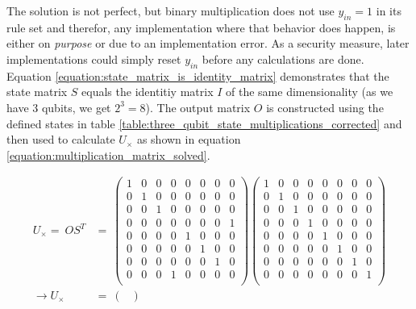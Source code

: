 \newpage

The solution is not perfect, but binary multiplication does not use $y_{in} = 1$ in its rule set and therefor, any implementation where that behavior does happen, is either on \emph{purpose} or due to an implementation error. As a security measure, later implementations could simply reset $y_{in}$ before any calculations are done. Equation \ref{equation:state_matrix_is_identity_matrix} demonstrates that the state matrix $S$ equals the identitiy matrix $I$ of the same dimensionality (as we have 3 qubits, we get $2^3 = 8$). The output matrix $O$ is constructed using the defined states in table \ref{table:three_qubit_state_multiplications_corrected} and then used to calculate $U_{\times}$ as shown in equation \ref{equation:multiplication_matrix_solved}.

\begin{equation}
    \begin{split}
        U_{\times} =\ OS^T &=\ \begin{pmatrix}
         1 & 0 & 0 & 0 & 0 & 0 & 0 & 0\\
         0 & 1 & 0 & 0 & 0 & 0 & 0 & 0\\
         0 & 0 & 1 & 0 & 0 & 0 & 0 & 0\\
         0 & 0 & 0 & 0 & 0 & 0 & 0 & 1\\
         0 & 0 & 0 & 0 & 1 & 0 & 0 & 0\\
         0 & 0 & 0 & 0 & 0 & 1 & 0 & 0\\
         0 & 0 & 0 & 0 & 0 & 0 & 1 & 0\\
         0 & 0 & 0 & 1 & 0 & 0 & 0 & 0\\
         \end{pmatrix}\begin{pmatrix}
         1 & 0 & 0 & 0 & 0 & 0 & 0 & 0\\
         0 & 1 & 0 & 0 & 0 & 0 & 0 & 0\\ 
         0 & 0 & 1 & 0 & 0 & 0 & 0 & 0\\
         0 & 0 & 0 & 1 & 0 & 0 & 0 & 0\\
         0 & 0 & 0 & 0 & 1 & 0 & 0 & 0\\
         0 & 0 & 0 & 0 & 0 & 1 & 0 & 0\\
         0 & 0 & 0 & 0 & 0 & 0 & 1 & 0\\
         0 & 0 & 0 & 0 & 0 & 0 & 0 & 1\\
        \end{pmatrix} \\ 
        \rightarrow U_{\times} &=\ \begin{pmatrix}

\end{pmatrix}
\end{split}
\end{equation}

